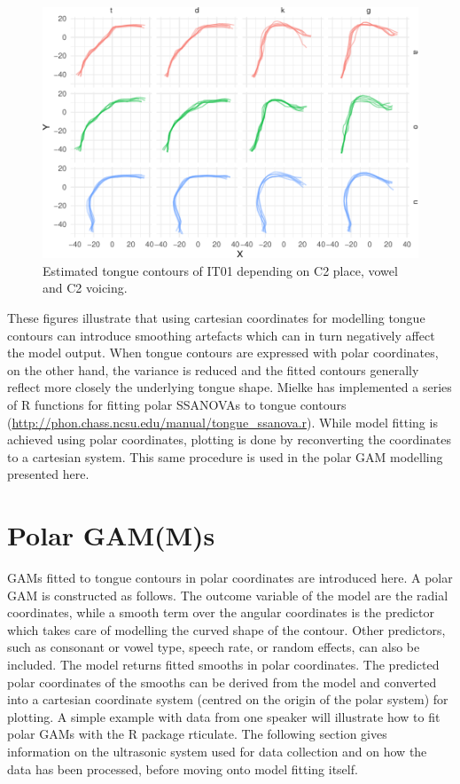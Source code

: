 \documentclass[
  11pt,
]{article}
\begin{document}
\begin{figure}

{\centering \includegraphics[width=\linewidth]{2018-polar-gam_files/figure-latex/Figure03} 

}

\caption{Estimated tongue contours of IT01 depending on C2 place, vowel and C2 voicing.}\label{f:Figure03}
\end{figure}

These figures illustrate that using cartesian coordinates for modelling
tongue contours can introduce smoothing artefacts which can in turn
negatively affect the model output. When tongue contours are expressed
with polar coordinates, on the other hand, the variance is reduced and
the fitted contours generally reflect more closely the underlying tongue
shape. Mielke has implemented a series of R \citep{r-core-team2018}
functions for fitting polar SSANOVAs to tongue contours
(\url{http://phon.chass.ncsu.edu/manual/tongue_ssanova.r}). While model
fitting is achieved using polar coordinates, plotting is done by
reconverting the coordinates to a cartesian system. This same procedure
is used in the polar GAM modelling presented here.

\hypertarget{polar-gamms}{%
\section{Polar GAM(M)s}\label{polar-gamms}}

GAMs fitted to tongue contours in polar coordinates are introduced here.
A polar GAM is constructed as follows. The outcome variable of the model
are the radial coordinates, while a smooth term over the angular
coordinates is the predictor which takes care of modelling the curved
shape of the contour. Other predictors, such as consonant or vowel type,
speech rate, or random effects, can also be included. The model returns
fitted smooths in polar coordinates. The predicted polar coordinates of
the smooths can be derived from the model and converted into a cartesian
coordinate system (centred on the origin of the polar system) for
plotting. A simple example with data from one speaker will illustrate
how to fit polar GAMs with the R package rticulate. The following
section gives information on the ultrasonic system used for data
collection and on how the data has been processed, before moving onto
model fitting itself.
\end{document}
